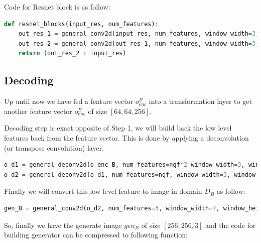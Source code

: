 \documentclass[peerreview]{IEEEtran}
\begin{document}
Code for Resnet block is as follow:

\begin{lstlisting}[language=Python]
def resnet_blocks(input_res, num_features):
    out_res_1 = general_conv2d(input_res, num_features, window_width=3, window_heigth=3, stride_width=1, stride_heigth=1)
    out_res_2 = general_conv2d(out_res_1, num_features, window_width=3, window_heigth=3, stride_width=1, stride_heigth=1)
    return (out_res_2 + input_res)
\end{lstlisting}

\subsection{Decoding}
Up until now we have fed a feature vector $o_{enc}^B$ into a transformation layer to get another feature vector $o_{enc}^B$ of size $[64,64,256]$.

Decoding step is exact opposite of Step 1, we will build back the low level features back from the feature vector. This is done by applying a deconvolution (or transpose convolution) layer.

\begin{lstlisting}[language=Python]
o_d1 = general_deconv2d(o_enc_B, num_features=ngf*2 window_width=3, window_height=3, stride_width=2, stride_height=2)
o_d2 = general_deconv2d(o_d1, num_features=ngf, window_width=3, window_height=3, stride_width=2, stride_height=2)
\end{lstlisting}

Finally we will convert this low level feature to image in domain $D_B$ as follow:

\begin{lstlisting}[language=Python]
gen_B = general_conv2d(o_d2, num_features=3, window_width=7, window_height=7, stride_width=1, stride_height=1)
\end{lstlisting}

So, finally we have the generate image $gen_B$ of size $[256,256,3]$ and the code for building generator can be compressed to following function:
\end{document}

